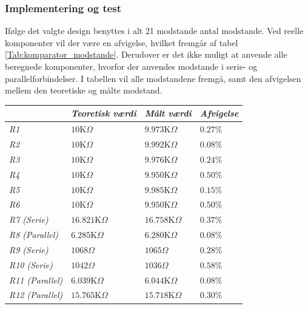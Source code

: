 \subsubsection{Implementering og test}
Ifølge det valgte design benyttes i alt 21 modstande antal modstande. Ved reelle komponenter vil der være en afvigelse, hvilket fremgår af tabel \ref{Tab:komparator_modstande}. Derudover er det ikke muligt at anvende alle beregnede komponenter, hvorfor der anvendes modstande i serie- og parallelforbindelser. I tabellen vil alle modstandene fremgå, samt den afvigelsen mellem den teoretiske og målte modstand. 
\begin{table}[H]
\centering
\begin{tabular}{|l|l|l|l|}
\hline
\textit{}               & \textit{Teoretisk værdi} & \textit{Målt værdi} & \textit{Afvigelse} \\ \hline
\textit{R1}             & $10$K$\Omega$            & $9.973$K$\Omega$    & $0.27\%$           \\ \hline
\textit{R2}             & $10$K$\Omega$            & $9.992$K$\Omega$    & $0.08\%$           \\ \hline
\textit{R3}             & $10$K$\Omega$            & $9.976$K$\Omega$    & $0.24\%$           \\ \hline
\textit{R4}             & $10$K$\Omega$            & $9.950$K$\Omega$    & $0.50\%$           \\ \hline
\textit{R5}             & $10$K$\Omega$            & $9.985$K$\Omega$    & $0.15\%$           \\ \hline
\textit{R6}             & $10$K$\Omega$            & $9.950$K$\Omega$    & $0.50\%$           \\ \hline
\textit{R7 (Serie)}     & $16.821$K$\Omega$        & $16.758$K$\Omega$   & $0.37\%$           \\ \hline
\textit{R8 (Parallel)}  & $6.285$K$\Omega$         & $6.280$K$\Omega$    & $0.08\%$           \\ \hline
\textit{R9 (Serie)}     & $1068\Omega$             & $1065\Omega$        & $0.28\%$           \\ \hline
\textit{R10 (Serie)}    & $1042\Omega$             & $1036\Omega$        & $0.58\%$           \\ \hline
\textit{R11 (Parallel)} & $6.039$K$\Omega$         & $6.044$K$\Omega$    & $0.08\%$           \\ \hline
\textit{R12 (Parallel)} & $15.765$K$\Omega$        & $15.718$K$\Omega$   & $0.30\%$           \\ \hline

\end{tabular}
\end{table}
